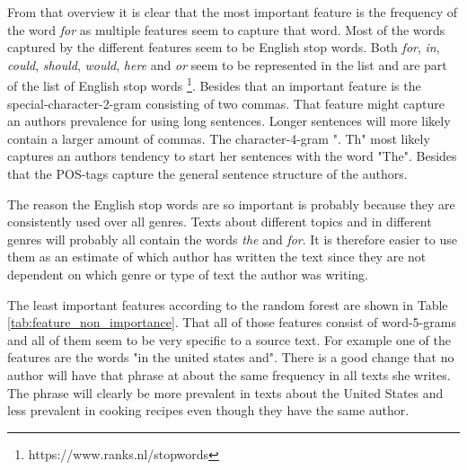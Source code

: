 From that overview it is clear that the most important feature is the frequency
of the word \textit{for} as multiple features seem to capture that word. Most
of the words captured by the different features seem to be English stop words.
Both \textit{for}, \textit{in}, \textit{could}, \textit{should}, \textit{would},
\textit{here} and \textit{or} seem to be represented in the list and are part
of the list of English stop words \footnote{https://www.ranks.nl/stopwords}.
Besides that an important feature is the special-character-2-gram consisting
of two commas. That feature might capture an authors prevalence for using long
sentences. Longer sentences will more likely contain a larger amount of commas.
The character-4-gram ". Th" most likely captures an authors tendency to start
her sentences with the word "The". Besides that the \gls{POS}-tags capture the
general sentence structure of the authors.

The reason the English stop words are so important is probably because they are
consistently used over all genres. Texts about different topics and in different
genres will probably all contain the words \textit{the} and \textit{for}. It
is therefore easier to use them as an estimate of which author has written the
text since they are not dependent on which genre or type of text the author was
writing.

The least important features according to the random forest are shown in
Table \ref{tab:feature_non_importance}. That all of those features consist of
word-5-grams and all of them seem to be very specific to a source text. For
example one of the features are the words "in the united states and". There is a
good change that no author will have that phrase at about the same frequency in
all texts she writes. The phrase will clearly be more prevalent in texts about
the United States and less prevalent in cooking recipes even though they have
the same author.

